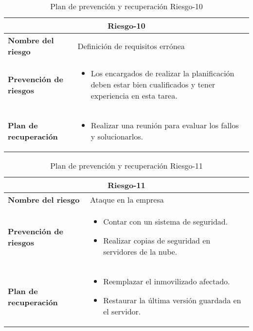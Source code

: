 \begin{table}[H]
\begin{center}
\begin{tabular}{p{} p{10cm}}
\multicolumn{2}{c}{\textbf{Riesgo-10} } \\
\hline \hline
\textbf{Nombre del riesgo} & Definición de requisitos errónea \\
\hline
\textbf{Prevención de riesgos} & \begin{itemize}[-]
  \item Los encargados de realizar la planificación deben estar bien cualificados y tener experiencia en esta tarea.
  \end{itemize} \\
\hline
\textbf{Plan de recuperación} &   \begin{itemize}[-]
  \item Realizar una reunión para evaluar los fallos y solucionarlos.
  \end{itemize}\\
\hline
\end{tabular}
\caption{Plan de prevención y recuperación Riesgo-10}
\label{tab:Riesgo-10-Prev_Recup}
\end{center}
\end{table}

\begin{table}[H]
\begin{center}
\begin{tabular}{p{} p{10cm}}
\multicolumn{2}{c}{\textbf{Riesgo-11} } \\
\hline \hline
\textbf{Nombre del riesgo} & Ataque en la empresa \\
\hline
\textbf{Prevención de riesgos} & \begin{itemize}[-]
  \item Contar con un sistema de seguridad.
  \item Realizar copias de seguridad en servidores de la nube.
  \end{itemize} \\
\hline
\textbf{Plan de recuperación} &   \begin{itemize}[-]
  \item Reemplazar el inmovilizado afectado.
  \item Restaurar la última versión guardada en el servidor.
  \end{itemize}\\
\hline
\end{tabular}
\caption{Plan de prevención y recuperación Riesgo-11}
\label{tab:Riesgo-11-Prev_Recup}
\end{center}
\end{table}

